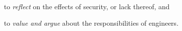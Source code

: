 \item to \emph{reflect} on the effects of security, or lack thereof, and
\item to \emph{value and argue} about the responsibilities of engineers.
